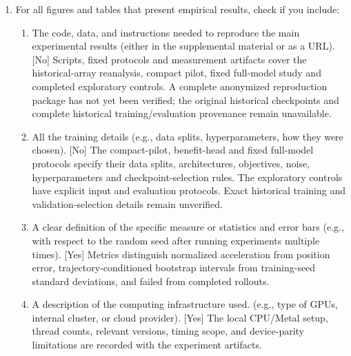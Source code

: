 \begin{enumerate}
  \item For all figures and tables that present empirical results, check if you include:
  \begin{enumerate}
    \item The code, data, and instructions needed to reproduce the main experimental results (either in the supplemental material or as a URL). [No] Scripts, fixed protocols and measurement artifacts cover the historical-array reanalysis, compact pilot, fixed full-model study and completed exploratory controls. A complete anonymized reproduction package has not yet been verified; the original historical checkpoints and complete historical training/evaluation provenance remain unavailable.
    \item All the training details (e.g., data splits, hyperparameters, how they were chosen). [No] The compact-pilot, benefit-head and fixed full-model protocols specify their data splits, architectures, objectives, noise, hyperparameters and checkpoint-selection rules. The exploratory controls have explicit input and evaluation protocols. Exact historical training and validation-selection details remain unverified.
    \item A clear definition of the specific measure or statistics and error bars (e.g., with respect to the random seed after running experiments multiple times). [Yes] Metrics distinguish normalized acceleration from position error, trajectory-conditioned bootstrap intervals from training-seed standard deviations, and failed from completed rollouts.
    \item A description of the computing infrastructure used. (e.g., type of GPUs, internal cluster, or cloud provider). [Yes] The local CPU/Metal setup, thread counts, relevant versions, timing scope, and device-parity limitations are recorded with the experiment artifacts.
  \end{enumerate}


\end{enumerate}
